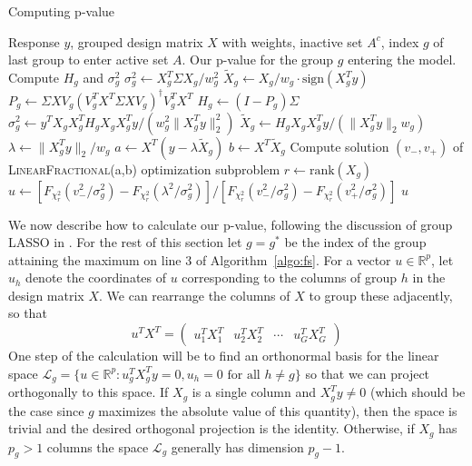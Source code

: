 \documentclass{imsart}
\newcommand{\real}{\mathbb{R}}
\newcommand{\norm}[1]{\lVert #1 \rVert}
\newcommand{\vecsp}{\mathcal{L}}
\newcommand{\gstar}{g^*}
\begin{document}
\begin{algorithm}
 \caption{Computing p-value}
 \label{algo:pval}
 \begin{algorithmic}
   \REQUIRE Response $y$, grouped design matrix $X$ with weights, inactive set $A^c$, index $g$ of last group to enter active set $A$.
   \ENSURE Our p-value for the group $g$ entering the model.
   \STATE Compute $H_g$ and $\sigma^2_g$
   \STATE $\sigma_g^2 \gets X_g^T\Sigma X_g/w_g^2$
   \STATE $\tilde X_g \gets X_g / w_g \cdot \text{sign}(X_g^Ty)$
   \ELSE
   \STATE $P_g \gets \Sigma XV_g (V_g^T X^T \Sigma X V_g)^\dagger V_g^TX^T$
   \STATE $H_g \gets (I - P_g)\Sigma$
   \STATE $\sigma^2_g \gets y^TX_gX_g^T H_g X_gX_g^Ty / (w_g^2 \norm{X_g^Ty}_2^2)$
   \STATE $\tilde X_g \gets H_g X_g X_g^T y /(\norm{X_g^Ty}_2 w_g)$
   \ENDIF
   \STATE $\lambda \gets \norm{X_g^Ty}_2/w_g$
   \STATE {}
   \STATE $a \gets X^T(y - \lambda \tilde X_g)$
   \STATE $b \gets X^T \tilde X_g$
   \STATE Compute solution $(v_-, v_+)$ of \textsc{LinearFractional}(a,b) optimization subproblem
   \STATE $r \gets \text{rank}(X_g)$
   \STATE $u \gets [F_{\chi^2_r}(v^2_-/\sigma_g^2) - F_{\chi^2_r}(\lambda^2/\sigma_g^2)]/[F_{\chi^2_r}(v^2_-/\sigma_g^2) - F_{\chi^2_r}(v^2_+/\sigma_g^2)]$
   \RETURN $u$
 \end{algorithmic}
\end{algorithm}

We now describe how to calculate our p-value, following the discussion of
group LASSO in \cite{tests:adaptive}. For the rest of this section let
$g = \gstar$ be the index of
the group attaining the maximum on line 3 of Algorithm~\ref{algo:fs}.
For a vector $u \in \real^p$, let $u_h$ denote the coordinates
of $u$ corresponding to the columns of group $h$ in the design matrix $X$.
We can rearrange the columns of $X$ to group these adjacently, so that
\[
u^TX^T = \begin{pmatrix} u_1^T X_1^T & u_2^T X_2^T & \cdots & u_G^TX_G^T \end{pmatrix}
\]
One step of the calculation will be to find an orthonormal basis for the
linear space $\vecsp_g = \{ u \in \real^p : u_g^T X_g^T y = 0, u_h = 0
\text{ for all } h \neq g \}$ so that we can project orthogonally to
this space. If $X_g$ is a single column and $X_g^Ty \neq 0$ (which
should be the case since $g$ maximizes the absolute value of this
quantity), then the
space is trivial and the desired orthogonal projection is the identity.
Otherwise, if $X_g$ has $p_g > 1$ columns the space $\vecsp_g$
generally has dimension $p_g-1$.
\end{document}
